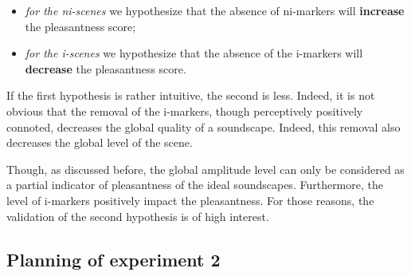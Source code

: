 \documentclass[twoside,twocolumn]{article}
\begin{document}

\begin{itemize}
\item \emph{for the ni-scenes} we hypothesize that the absence of ni-markers will \textbf{increase} the pleasantness score;
\item \emph{for the i-scenes} we hypothesize that the absence of the i-markers will \textbf{decrease} the pleasantness score.
\end{itemize}


If the first hypothesis is rather intuitive, the second is less. Indeed, it is not obvious that the removal of the i-markers, though perceptively positively connoted, decreases the global quality of a soundscape. Indeed, this removal also decreases the global level of the scene.


Though, as discussed before, the global amplitude level can only be considered as a partial indicator of pleasantness of the ideal soundscapes. Furthermore, the level of i-markers positively impact the pleasantness. For those reasons, the validation of the second hypothesis is of high interest.

\subsection{Planning of experiment 2}
\end{document}
